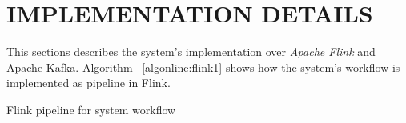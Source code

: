 \section{IMPLEMENTATION DETAILS}
This sections describes the system's implementation over \emph{Apache Flink} and Apache Kafka. Algorithm ~\ref{algonline:flink1} shows how the system's workflow  is implemented as pipeline in Flink.

\begin{algorithm}
	\caption{Flink pipeline for system workflow} 
	\begin{algorithmic}[1] 
		\Statex  
		
	\end{algorithmic}
	\label{algonline:flink1}
\end{algorithm}